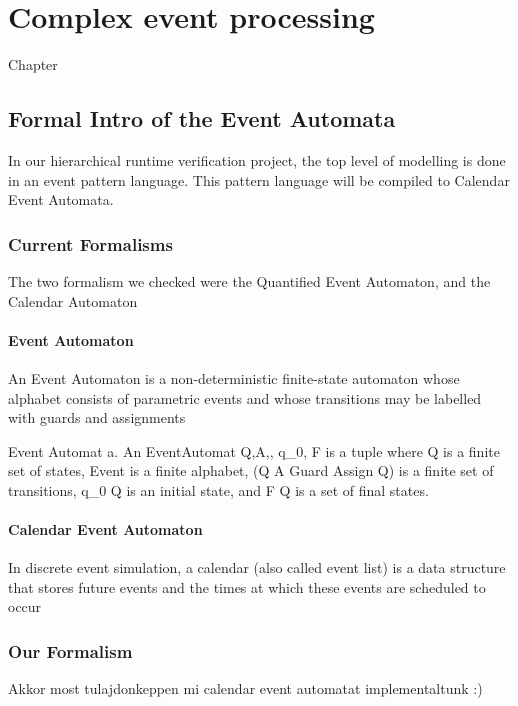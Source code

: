 \chapter{Complex event processing}
\label{chap:cep}

Chapter
\section{Formal Intro of the Event Automata}
	In our hierarchical runtime verification project, the top level of modelling is done in an event pattern language.
	This pattern language will be compiled to Calendar Event Automata.
	\subsection{Current Formalisms}
		The two formalism we checked were the Quantified Event Automaton, and the Calendar Automaton
		\subsubsection{Event Automaton}
			An Event Automaton is a non-deterministic finite-state automaton whose alphabet consists
			of parametric events and whose transitions may be labelled with guards and assignments
			
			\begin{dfn}
			Event Automat a. An EventAutomat \textlangle Q,A,\delta, q_0, F \textrangle
			is a tuple where Q is a finite set of states,  \subseteq
			Event is a finite alphabet, \delta \in (Q \texttimes A \texttimes Guard \texttimes Assign \texttimes Q)
			is a finite set of transitions, q_0 \in Q is an initial state, and F \subseteq Q is a set of final states.
			\end{dfn}
			
		\subsubsection{Calendar Event Automaton}
			In discrete event simulation, a calendar (also called event list) is a data structure that
			stores future events and the times at which these events are scheduled to occur
			
	\subsection{Our Formalism}
		Akkor most tulajdonkeppen mi calendar event automatat implementaltunk :) 
